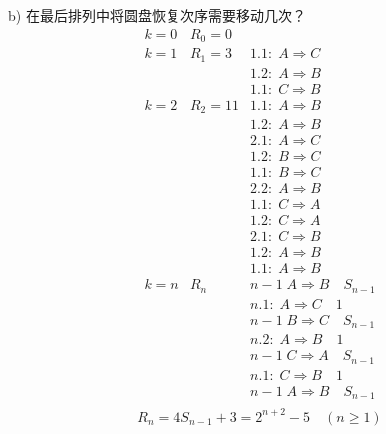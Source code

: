 \begin{answer}
	b) 在最后排列中将圆盘恢复次序需要移动几次？
	\begin{equation*}
		\begin{array}{lll}
			k=0	& R_0=0		&	\\
			k=1	& R_1=3		& 1.1:\; A \Rightarrow C\\
				&			& 1.2:\; A \Rightarrow B\\
				&			& 1.1:\; C \Rightarrow B\\
			k=2	& R_2=11	& 1.1:\; A \Rightarrow B\\
				&			& 1.2:\; A \Rightarrow B\\
				&			& 2.1:\; A \Rightarrow C\\
				&			& 1.2:\; B \Rightarrow C\\
				&			& 1.1:\; B \Rightarrow C\\
				&			& 2.2:\; A \Rightarrow B\\
				&			& 1.1:\; C \Rightarrow A\\
				&			& 1.2:\; C \Rightarrow A\\
				&			& 2.1:\; C \Rightarrow B\\
				&			& 1.2:\; A \Rightarrow B\\
				&			& 1.1:\; A \Rightarrow B\\
			k=n	& R_n 		& n-1\;  			A \Rightarrow B\quad S_{n-1}\\
				&			& n.1:\; 			A \Rightarrow C\quad 1		\\	
				&			& n-1\; 			B \Rightarrow C\quad S_{n-1}\\	
				&			& n.2:\; 			A \Rightarrow B\quad 1		\\	
				&			& n-1\; 			C \Rightarrow A\quad S_{n-1}\\	
				&			& n.1:\; 			C \Rightarrow B\quad 1		\\
				&			& n-1\;  			A \Rightarrow B\quad S_{n-1}\\
		\end{array}
	\end{equation*}
\begin{equation*}
	R_n = 4S_{n-1}+3 = 2^{n+2}-5 \quad(n\geqslant 1)
\end{equation*}
\end{answer}

